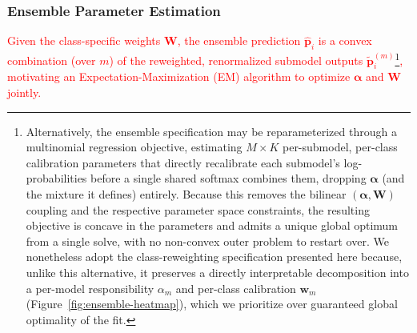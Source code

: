 \documentclass[11pt]{elsarticle}
\newcommand{\revadd}[1]{\textcolor{red}{#1}}
\begin{document}
\subsubsection{Ensemble Parameter Estimation}
\revadd{Given the class-specific weights $\bm{W}$, the ensemble prediction $\hat{\bm{p}}_i$ is a convex combination (over $m$) of the reweighted, renormalized submodel outputs $\tilde{\bm{p}}_i^{(m)}$\footnote{Alternatively, the ensemble specification may be reparameterized through a multinomial regression objective, estimating $M \times K$ per-submodel, per-class calibration parameters that directly recalibrate each submodel's log-probabilities before a single shared softmax combines them, dropping $\bm{\alpha}$ (and the mixture it defines) entirely. Because this removes the bilinear $(\bm{\alpha}, \bm{W})$ coupling and the respective parameter space constraints, the resulting objective is concave in the parameters and admits a unique global optimum from a single solve, with no non-convex outer problem to restart over. We nonetheless adopt the class-reweighting specification presented here because, unlike this alternative, it preserves a directly interpretable decomposition into a per-model responsibility $\alpha_m$ and per-class calibration $\bm{w}_m$ (Figure~\ref{fig:ensemble-heatmap}), which we prioritize over guaranteed global optimality of the fit.}, motivating an Expectation-Maximization (EM) algorithm to optimize $\bm{\alpha}$ and $\bm{W}$ jointly.}
\end{document}
